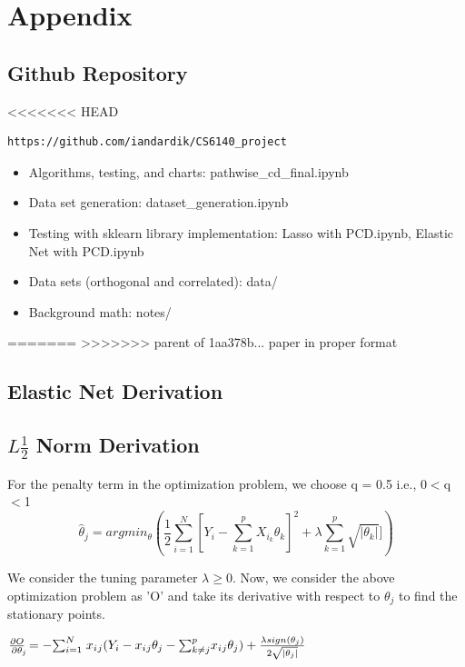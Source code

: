 \documentclass[11pt]{article}
\begin{document}
\section{Appendix}

\subsection{Github Repository}
<<<<<<< HEAD
\begin{verbatim}
https://github.com/iandardik/CS6140_project
\end{verbatim}
\begin{itemize}
	\item Algorithms, testing, and charts: pathwise\_cd\_final.ipynb
	\item Data set generation: dataset\_generation.ipynb
	\item Testing with sklearn library implementation: Lasso with PCD.ipynb, Elastic Net with PCD.ipynb
	\item Data sets (orthogonal and correlated): data/
	\item Background math: notes/
\end{itemize}
=======
>>>>>>> parent of 1aa378b... paper in proper format

\subsection{Elastic Net Derivation}

\subsection{$L\frac{1}{2}$ Norm Derivation}

For the penalty term in the optimization problem, we choose q = 0.5 i.e., 0$<$q$<$1
\newline
\begin{equation}
            \hat{\theta}_j = argmin_{\theta} {( \frac{1}{2}  \sum_{i=1}^{N}[Y_i - \sum_{k=1}^{p} X_{i_k}\theta_k]^2  + \lambda \sum_{k=1}^p \sqrt{|\theta_k|}])}
\end{equation}

\newline

We consider the tuning parameter $\lambda\geq$0. Now, we consider the above optimization problem as 'O' and take its derivative with respect to $\theta_j$ to find the stationary points. 
\newline


$\frac{\partial O}{\partial \theta_{\rlap{$\scriptscriptstyle j$}}} = - {\sum}_{i=1}^{N} \; x_i{_j}(Y_i - x_i{_j}\theta_j - {\sum}_{k\neq j}^{p} x_i{_j}\theta_j) + \frac{\lambda sign(\theta_j)}{2 \sqrt{|\theta_j|}}$
\newline
\end{document}
